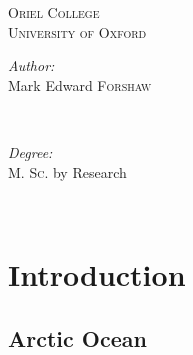 \documentclass[12pt,a4paper]{report}
\begin{document}
\begin{titlepage}
	\textsc{\large Oriel College}\\[0.5cm] %
	\textsc{\LARGE University of Oxford}\\[1.5cm] %
	
	
	
	\begin{minipage}{0.45\textwidth}
		\begin{flushleft} \large
			\emph{Author:}\\
			Mark Edward  \textsc{Forshaw} %
		\end{flushleft}
	\end{minipage}
	~
	\begin{minipage}{0.45\textwidth}
		\begin{flushright} \large
			\emph{Degree:} \\
			 \textsc{M. Sc.} by Research 
		\end{flushright}
	\end{minipage}\\[4cm]
	
	
	
	
	
	\vfill %
	
\end{titlepage}



\chapter{Introduction}
\label{intro}

\glsresetall

\section{Arctic Ocean}
\label{arcticocean}
\end{document}
